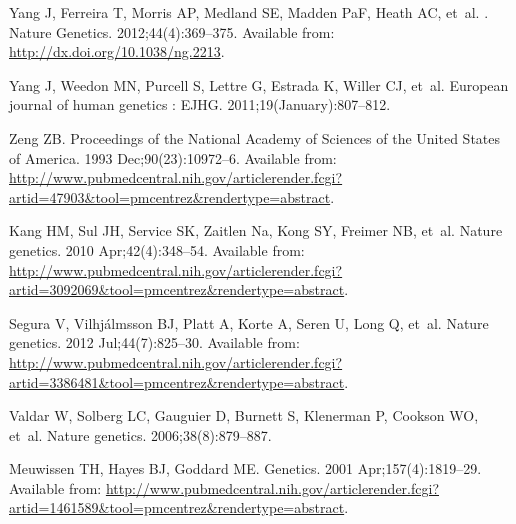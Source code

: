 \documentclass[10pt,letterpaper]{article}
\begin{document}
\begin{thebibliography}{}
Yang J, Ferreira T, Morris AP, Medland SE, Madden PaF, Heath AC, et~al.
.
\newblock Nature Genetics. 2012;44(4):369--375.
\newblock Available from: \url{http://dx.doi.org/10.1038/ng.2213}.

Yang J, Weedon MN, Purcell S, Lettre G, Estrada K, Willer CJ, et~al.
\newblock European journal of human genetics : EJHG. 2011;19(January):807--812.

Zeng ZB.
\newblock Proceedings of the National Academy of Sciences of the United States
  of America. 1993 Dec;90(23):10972--6.
\newblock Available from:
  \url{http://www.pubmedcentral.nih.gov/articlerender.fcgi?artid=47903\&tool=pmcentrez\&rendertype=abstract}.

Kang HM, Sul JH, Service SK, Zaitlen Na, Kong SY, Freimer NB, et~al.
\newblock Nature genetics. 2010 Apr;42(4):348--54.
\newblock Available from:
  \url{http://www.pubmedcentral.nih.gov/articlerender.fcgi?artid=3092069\&tool=pmcentrez\&rendertype=abstract}.

Segura V, Vilhj\'{a}lmsson BJ, Platt A, Korte A, Seren U, Long Q, et~al.
\newblock Nature genetics. 2012 Jul;44(7):825--30.
\newblock Available from:
  \url{http://www.pubmedcentral.nih.gov/articlerender.fcgi?artid=3386481\&tool=pmcentrez\&rendertype=abstract}.

Valdar W, Solberg LC, Gauguier D, Burnett S, Klenerman P, Cookson WO, et~al.
\newblock Nature genetics. 2006;38(8):879--887.

Meuwissen TH, Hayes BJ, Goddard ME.
\newblock Genetics. 2001 Apr;157(4):1819--29.
\newblock Available from:
  \url{http://www.pubmedcentral.nih.gov/articlerender.fcgi?artid=1461589\&tool=pmcentrez\&rendertype=abstract}.


\end{thebibliography}
\end{document}
